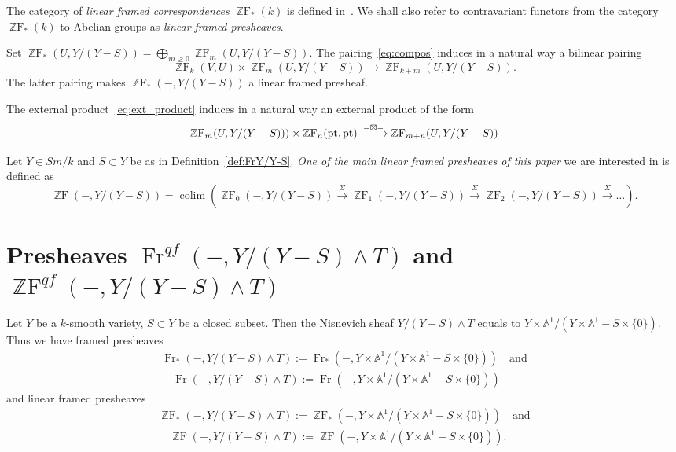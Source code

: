 \documentclass[a4paper,11pt,reqno]{amsart}
\begin{document}
The category of {\it linear framed correspondences ${\operatorname{\mathbb{Z}F}}_*(k)$\/} is
defined in~\cite{GP1}. We shall also refer to contravariant functors
from the category ${\operatorname{\mathbb{Z}F}}_*(k)$ to Abelian groups as {\it linear framed
presheaves}.

Set ${\operatorname{\mathbb{Z}F}}_*(U,Y/(Y-S))=\bigoplus_{m{\geqslant} 0}{\operatorname{\mathbb{Z}F}}_m(U,Y/(Y-S))$. The
pairing~\eqref{eq:compos} induces in a natural way a bilinear
pairing
\begin{equation}\label{eq:linear_comp}
{\operatorname{\mathbb{Z}F}}_k(V,U)\times {\operatorname{\mathbb{Z}F}}_m(U,Y/(Y-S))\to {\operatorname{\mathbb{Z}F}}_{k+m}(U,Y/(Y-S)).
\end{equation}
The latter pairing makes ${\operatorname{\mathbb{Z}F}}_*(-,Y/(Y-S))$ a linear framed
presheaf.

The external product~\eqref{eq:ext_product} induces in a natural way
an external product of the form
\begin{equation}\label{eq:linear_ext_product}
{\operatorname{\mathbb{Z}F}}_m(U,Y/(Y-S)))\times {\operatorname{\mathbb{Z}F}}_n({{\rm pt}},{{\rm pt}}) \xrightarrow{-\boxtimes -}
{\operatorname{\mathbb{Z}F}}_{m+n}(U,Y/(Y-S))
\end{equation}

Let $Y\in Sm/k$ and $S\subset Y$ be as in
Definition~\ref{def:FrY/Y-S}. {\it One of the main linear framed
presheaves of this paper\/} we are interested in is defined as
$${\operatorname{\mathbb{Z}F}}(-,Y/(Y-S))=\operatorname{colim}({\operatorname{\mathbb{Z}F}}_0(-,Y/(Y-S))\xrightarrow{\Sigma}{\operatorname{\mathbb{Z}F}}_1(-,Y/(Y-S))\xrightarrow{\Sigma} {\operatorname{\mathbb{Z}F}}_2(-,Y/(Y-S))\xrightarrow{\Sigma}\dots).$$

\section{Presheaves ${\operatorname{Fr}}^{qf}(-,Y/(Y-S)\wedge T)$ and ${\operatorname{\mathbb{Z}F}}^{qf}(-,Y/(Y-S)\wedge T)$}\label{sec:Fr_qf_and_ZF_qf}

Let $Y$ be a $k$-smooth variety, $S\subset Y$ be a closed subset. Then the Nisnevich sheaf
$Y/(Y-S)\wedge T$ equals to $Y\times {\mathbb{A}}^1/(Y\times {\mathbb{A}}^1-S\times \{0\})$.
Thus we have framed presheaves
\begin{multline*}
{\operatorname{Fr}}_*(-,Y/(Y-S)\wedge T):={\operatorname{Fr}}_*(-,Y\times {\mathbb{A}}^1/(Y\times {\mathbb{A}}^1-S\times \{0\})) \quad \text{and} \\
\quad {\operatorname{Fr}}(-,Y/(Y-S)\wedge T):={\operatorname{Fr}}(-,Y\times {\mathbb{A}}^1/(Y\times {\mathbb{A}}^1-S\times \{0\}))
\end{multline*}
and linear framed presheaves
\begin{multline*}
{\operatorname{\mathbb{Z}F}}_*(-,Y/(Y-S)\wedge T):={\operatorname{\mathbb{Z}F}}_*(-,Y\times {\mathbb{A}}^1/(Y\times {\mathbb{A}}^1-S\times \{0\})) \quad \text{and} \\
\quad   {\operatorname{\mathbb{Z}F}}(-,Y/(Y-S)\wedge T):={\operatorname{\mathbb{Z}F}}(-,Y\times {\mathbb{A}}^1/(Y\times {\mathbb{A}}^1-S\times \{0\})).
\end{multline*}
\end{document}
